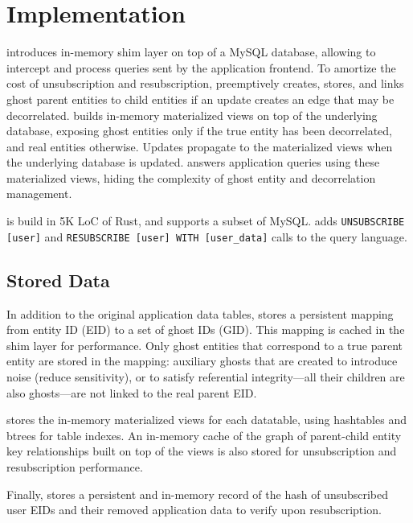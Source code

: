 \iffalse
\section{Implementation}

\name introduces in-memory shim layer on top of a MySQL database, 
allowing \name to intercept and process queries sent by the application frontend. 
To amortize the cost of unsubscription and resubscription, \name preemptively creates, stores, and
links ghost parent entities to child entities if an update creates an edge that may be decorrelated.
\name builds in-memory materialized views on top of the underlying database, exposing ghost
entities only if the true entity has been decorrelated, and real entities otherwise. Updates
propagate to the materialized views when the underlying database is updated. \name answers
application queries using these materialized views, hiding the complexity of ghost entity and
decorrelation management.

\name is build in 5K LoC of Rust, and supports a subset of MySQL. \name adds \texttt{UNSUBSCRIBE
[user]} and \texttt{RESUBSCRIBE [user] WITH [user\_data]} calls to the query language.

\subsection{Stored Data}
In addition to the original application data tables, \name stores a persistent mapping from entity
ID (EID) to a set of ghost IDs (GID). This mapping is cached in the shim layer for performance. Only
ghost entities that correspond to a true parent entity are stored in the mapping: auxiliary ghosts that are
created to introduce noise (reduce sensitivity), or to satisfy referential integrity---all their
children are also ghosts---are not linked to the real parent EID.

\name stores the in-memory materialized views for each datatable, using hashtables and btrees for
table indexes. An in-memory cache of the graph of parent-child entity key relationships built on
top of the views is also stored for unsubscription and resubscription performance.

Finally, \name stores a persistent and in-memory record of the hash of unsubscribed user EIDs 
and their removed application data to verify upon resubscription.

